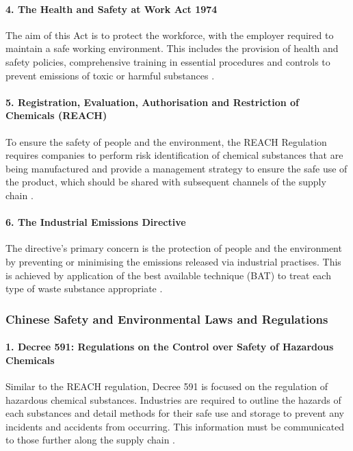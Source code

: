 \paragraph{4. The Health and Safety at Work Act 1974}
The aim of this Act is to protect the workforce, with the employer required to maintain a safe working environment. This includes the provision of health and safety policies, comprehensive training in essential procedures and controls to prevent emissions of toxic or harmful substances \cite{british_safety_concil_health_nodate}.

\paragraph{5. Registration, Evaluation, Authorisation and Restriction of Chemicals (REACH) }
To ensure the safety of people and the environment, the REACH Regulation requires companies to perform risk identification of chemical substances that are being manufactured and provide a management strategy to ensure the safe use of the product, which should be shared with subsequent channels of the supply chain \cite{govuk_uk_nodate}.

\paragraph{6. The Industrial Emissions Directive}

The directive’s primary concern is the protection of people and the environment by preventing or minimising the emissions released via industrial practises. This is achieved by application of the best available technique (BAT) to treat each type of waste substance appropriate \cite{european_commission_industrial_nodate}. 

\subsubsection{Chinese Safety and Environmental Laws and Regulations}

\paragraph{1. Decree 591: Regulations on the Control over Safety of Hazardous Chemicals}
Similar to the REACH regulation, Decree 591 is focused on the regulation of hazardous chemical substances. Industries are required to outline the hazards of each substances and detail methods for their safe use and storage to prevent any incidents and accidents from occurring. This information must be communicated to those further along the supply chain \cite{team_decree_nodate}. 

